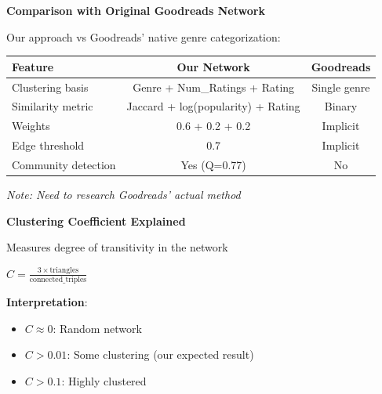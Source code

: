 \documentclass{beamer}
\begin{document}
  \begin{frame}
    \fontsize{10}{12}\selectfont
    \textbf{Comparison with Original Goodreads Network}
    
    \vspace{0.3cm}
    Our approach vs Goodreads' native genre categorization:
    
    \vspace{0.3cm}
    \begin{table}
      \centering
      \fontsize{10}{12}\selectfont
      \begin{tabular}{lcc}
        \toprule
        Feature & Our Network & Goodreads \\
        \midrule
        Clustering basis & Genre + Num\_Ratings + Rating & Single genre \\
        Similarity metric & Jaccard + log(popularity) + Rating & Binary \\
        Weights & 0.6 + 0.2 + 0.2 & Implicit \\
        Edge threshold & 0.7 & Implicit \\
        Community detection & Yes (Q=0.77) & No \\
        \bottomrule
      \end{tabular}
    \end{table}
    
    \vspace{0.3cm}
    \textit{Note: Need to research Goodreads' actual method}
  \end{frame}

  \begin{frame}
    \fontsize{10}{12}\selectfont
    \textbf{Clustering Coefficient Explained}
    
    \vspace{0.5cm}
    Measures degree of transitivity in the network
    
    \vspace{0.3cm}
    $C = \frac{3 \times \text{triangles}}{\text{connected\_triples}}$
    
    \vspace{0.5cm}
    \textbf{Interpretation}:
    \begin{itemize}
      \item $C \approx 0$: Random network
      \item $C > 0.01$: Some clustering (our expected result)
      \item $C > 0.1$: Highly clustered
    \end{itemize}
  \end{frame}
\end{document}
